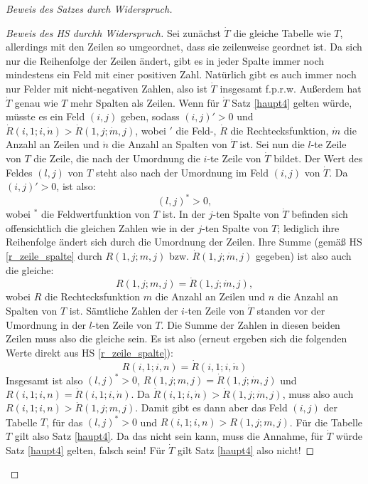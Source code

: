 \begin{proof}[Beweis des Satzes durch Widerspruch]
\begin{proof}[Beweis des HS durchh Widerspruch]
        Sei zunächst $\dot T$ die gleiche Tabelle wie $T$, allerdings mit den Zeilen so umgeordnet, dass sie 
        zeilenweise geordnet ist. Da sich nur die Reihenfolge der Zeilen ändert, gibt es in jeder Spalte immer noch 
        mindestens ein Feld mit einer positiven Zahl. Natürlich gibt es auch immer noch nur Felder mit nicht-negativen 
        Zahlen, also ist $\dot T$ insgesamt f.p.r.w. Außerdem hat $\dot T$ genau wie $T$ mehr Spalten als Zeilen. 
        Wenn für $\dot T$ Satz \ref{haupt4} gelten würde, müsste es ein Feld $(i, j)$ geben, sodass $(i, j)'>0$ 
        und $\dot R(i, 1; i, \dot n) > \dot R(1, j; \dot m, j)$, wobei $'$ die Feld-, $\dot R$ die Rechtecksfunktion, 
        $\dot m$ die Anzahl an Zeilen und $\dot n$ die Anzahl an Spalten von $\dot T$ ist. Sei nun die $l$-te Zeile 
        von $T$ die Zeile, die nach der Umordnung die $i$-te Zeile von $\dot T$ bildet. Der Wert des Feldes $(l, j)$ 
        von $T$ steht also nach der Umordnung im Feld $(i, j)$ von $\dot T$. Da $(i, j)'>0$, ist also:
        \[
            (l, j)^*>0,
        \]
        wobei $^*$ die Feldwertfunktion von $T$ ist. In der $j$-ten Spalte von $\dot T$ befinden sich offensichtlich 
        die gleichen Zahlen wie in der $j$-ten Spalte von $T$; lediglich ihre Reihenfolge ändert sich durch die 
        Umordnung der Zeilen. Ihre Summe (gemäß HS \ref{r_zeile_spalte} durch $R(1, j; m, j)$ bzw. $\dot R(1, j; 
        \dot m, j)$ gegeben) ist also auch die gleiche:
        \[
            R(1, j; m, j)=\dot R(1, j; \dot m, j),
        \]
        wobei $R$ die Rechtecksfunktion $m$ die Anzahl an Zeilen und $n$ die Anzahl an Spalten von $T$ ist. 
        Sämtliche Zahlen der $i$-ten Zeile von $\dot T$ standen vor der Umordnung in der $l$-ten Zeile von $T$. 
        Die Summe der Zahlen in diesen beiden Zeilen muss also die gleiche sein. Es ist also (erneut ergeben sich die 
        folgenden Werte direkt aus HS \ref{r_zeile_spalte}):
        \[
            R(i, 1; i, n)=\dot R(i, 1; i, \dot n)
        \]
        Insgesamt ist also $(l, j)^*>0$, $R(1, j; m, j)=\dot R(1, j; \dot m, j)$ und $R(i, 1; i, n)=\dot R(i, 1; i, 
        \dot n)$. Da $\dot R(i, 1; i, \dot n) > \dot R(1, j; \dot m, j)$, muss also auch $R(i, 1; i, n) > \dot 
        R(1, j; m, j)$. Damit gibt es dann aber das Feld $(i, j)$ der Tabelle $T$, für das $(l, j)^*>0$ und $R(i, 
        1; i, n) > R(1, j; m, j)$. Für die Tabelle $T$ gilt also Satz \ref{haupt4}. Da das nicht sein kann, 
        muss die Annahme, für $\dot T$ würde Satz \ref{haupt4} gelten, falsch sein! Für $\dot T$ gilt Satz 
        \ref{haupt4} also nicht!


\end{proof}
\end{proof}

